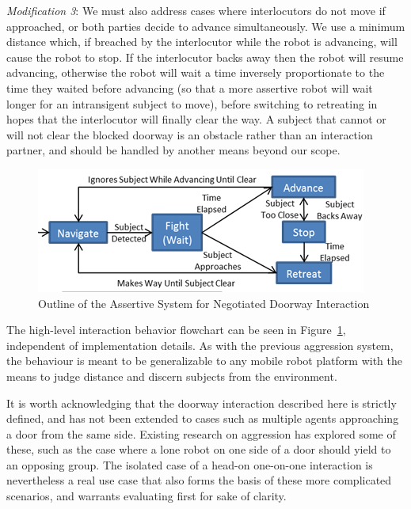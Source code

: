 \documentclass[letterpaper, 10 pt, conference]{ieeeconf}  %
\begin{document}
\textit{Modification 3}: We must also address cases where interlocutors do not move if approached, or both parties decide to advance simultaneously. We use a minimum distance which, if breached by the interlocutor while the robot is advancing, will cause the robot to stop. If the interlocutor backs away then the robot will resume advancing, otherwise the robot will wait a time inversely proportionate to the time they waited before advancing (so that a more assertive robot will wait longer for an intransigent subject to move), before switching to retreating in hopes that the interlocutor will finally clear the way. A subject that cannot or will not clear the blocked doorway is an obstacle rather than an interaction partner, and should be handled by another means beyond our scope. 
 
    \begin{figure}
      \centering
      \includegraphics{assertive_behavior.png}
      \caption{Outline of the Assertive System for Negotiated Doorway Interaction}
      \label{fig:Assertive}
   \end{figure}


The high-level interaction behavior flowchart can be seen in Figure~\ref{fig:Assertive}, independent of implementation details. As with the previous aggression system, the behaviour is meant to be generalizable to any mobile robot platform with the means to judge distance and discern subjects from the environment. 


It is worth acknowledging that the doorway interaction described here is strictly defined, and has not been extended to cases such as multiple agents approaching a door from the same side. Existing research on aggression has explored some of these, such as the case where a lone robot on one side of a door should yield to an opposing group\cite{zhang2006icra}. The isolated case of a head-on one-on-one interaction is nevertheless a real use case that also forms the basis of these more complicated scenarios, and warrants evaluating first for sake of clarity.
\end{document}
